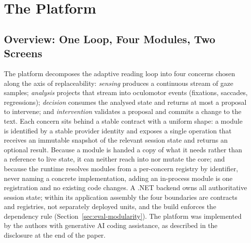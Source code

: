 \section{The Platform}
\label{sec:platform}

\subsection{Overview: One Loop, Four Modules, Two Screens}
\label{sec:platform-overview}

The platform decomposes the adaptive reading loop into four concerns chosen along the axis of replaceability: \emph{sensing} produces a continuous stream of gaze samples; \emph{analysis} projects that stream into oculomotor events (fixations, saccades, regressions); \emph{decision} consumes the analysed state and returns at most a proposal to intervene; and \emph{intervention} validates a proposal and commits a change to the text.
Each concern sits behind a stable contract with a uniform shape: a module is identified by a stable provider identity and exposes a single operation that receives an immutable snapshot of the relevant session state and returns an optional result.
Because a module is handed a copy of what it needs rather than a reference to live state, it can neither reach into nor mutate the core; and because the runtime resolves modules from a per-concern registry by identifier, never naming a concrete implementation, adding an in-process module is one registration and no existing code changes.
A .NET backend owns all authoritative session state; within its application assembly the four boundaries are contracts and registries, not separately deployed units, and the build enforces the dependency rule (Section~\ref{sec:eval-modularity}).
The platform was implemented by the authors with generative AI coding assistance, as described in the disclosure at the end of the paper.

